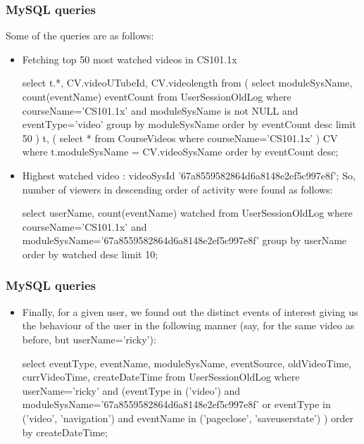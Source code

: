 \documentclass[12pt,xcolor=dvipsnames]{beamer}
\begin{document}
\begin{frame}[t]
\frametitle{MySQL queries}

Some of the queries are as follows:

\begin{itemize}
\item Fetching top 50 most watched videos in CS101.1x

\begin{tiny}
select t.*, CV.videoUTubeId, CV.videolength
	from ( 	
		select moduleSysName, count(eventName) eventCount
		from UserSessionOldLog
		where courseName='CS101.1x' 
			and moduleSysName is not NULL
			and eventType='video'
		group by moduleSysName order by eventCount desc limit 50
		) t,
		(
		select * from CourseVideos where courseName='CS101.1x'
		) CV
	where t.moduleSysName = CV.videoSysName
	order by eventCount desc;
\end{tiny}

\item Highest watched video : videoSysId '67a8559582864d6a8148e2ef5c997e8f'; So, number of viewers in descending order of activity were found as follows:

\begin{tiny}
select userName, count(eventName) watched
	from UserSessionOldLog
	where courseName='CS101.1x' and
		moduleSysName='67a8559582864d6a8148e2ef5c997e8f'
	group by userName order by watched desc limit 10;
\end{tiny}

\end{itemize}

\end{frame}


\begin{frame}[t]
\frametitle{MySQL queries}

\begin{itemize}
\item Finally, for a given user, we found out the distinct events of interest giving us the behaviour of the user in the following manner (say, for the same video as before, but userName='ricky'):

\begin{tiny}
select eventType, eventName, moduleSysName, eventSource, oldVideoTime, currVideoTime, createDateTime from UserSessionOldLog where userName='ricky' and (eventType in ('video') and moduleSysName='67a8559582864d6a8148e2ef5c997e8f' or eventType in ('video', 'navigation') and eventName in ('pageclose', 'saveuserstate') ) order by createDateTime;
\end{tiny}

\end{itemize}

\end{frame}
\end{document}
